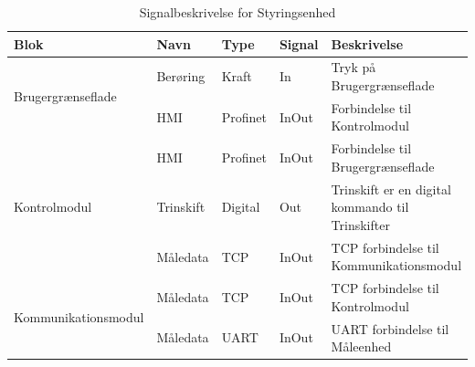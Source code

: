 \begin{table}[H]
	\centering
	\begin{tabular}{|l|l|l|l|p{4cm}|}
		\hline
		\textbf{Blok} & \textbf{Navn} & \textbf{Type} & \textbf{Signal} & 
		\textbf{Beskrivelse} \\\hline
		
		\multirow{2}{*}{Brugergrænseflade} 
		& Berøring & Kraft & In & Tryk på Brugergrænseflade \\\hhline{~----} 
		& HMI & Profinet & InOut & Forbindelse til Kontrolmodul \\\hline
		
		\multirow{3}{*}{Kontrolmodul} 
		& HMI & Profinet & InOut & Forbindelse til Brugergrænseflade \\\hhline{~----} 
		& Trinskift & Digital & Out & Trinskift er en digital kommando til Trinskifter \\\hhline{~----} 
		& Måledata & TCP & InOut & TCP forbindelse til Kommunikationsmodul \\\hline
		
		\multirow{2}{*}{Kommunikationsmodul} 
		& Måledata & TCP & InOut & TCP forbindelse til Kontrolmodul \\\hhline{~----} 
		& Måledata & UART & InOut & UART forbindelse til Måleenhed \\\hline
	\end{tabular}
	\caption{Signalbeskrivelse for Styringsenhed}
	\label{tab:SignalbeskrivelseSt}
	
\end{table}


\newpage